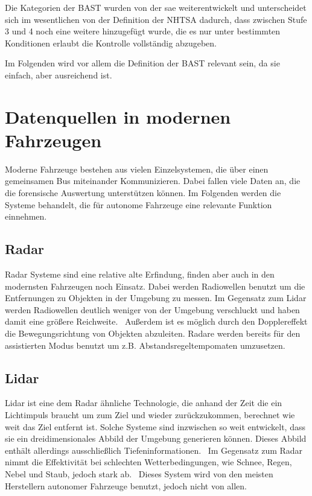 \documentclass[conference,compsoc,final,a4paper]{IEEEtran}
\begin{document}
Die Kategorien der \ac{BAST} wurden von der \ac{sae} weiterentwickelt \cite{bast2021} und unterscheidet sich im wesentlichen von der Definition der \ac{NHTSA} dadurch, dass zwischen Stufe 3 und 4 noch eine weitere hinzugefügt wurde, die es nur unter bestimmten Konditionen erlaubt die Kontrolle vollständig abzugeben\cite{SAE2021}.

Im Folgenden wird vor allem die Definition der \ac{BAST} relevant sein, da sie einfach, aber ausreichend ist.

\section{Datenquellen in modernen Fahrzeugen}

Moderne Fahrzeuge bestehen aus vielen Einzelsystemen, die über einen gemeinsamen Bus miteinander Kommunizieren.
Dabei fallen viele Daten an, die die forensische Auswertung unterstützen können. Im Folgenden werden die Systeme behandelt,
die für autonome Fahrzeuge eine relevante Funktion einnehmen.


\subsection{Radar}

Radar Systeme sind eine relative alte Erfindung, finden aber auch in den modernsten Fahrzeugen noch Einsatz.
Dabei werden Radiowellen benutzt um die Entfernungen zu Objekten in der Umgebung zu messen.
Im Gegensatz zum Lidar werden Radiowellen deutlich weniger von der Umgebung verschluckt und haben damit eine
größere Reichweite.~\cite{Neal2018} Außerdem ist es möglich durch den Dopplereffekt die Bewegungsrichtung von Objekten abzuleiten.
Radare werden bereits für den assistierten Modus benutzt um z.B. Abstandsregeltempomaten umzusetzen.

\subsection{Lidar}

Lidar ist eine dem Radar ähnliche Technologie, die anhand der Zeit die ein Lichtimpuls braucht um zum Ziel und wieder zurückzukommen, berechnet wie weit das Ziel entfernt ist. Solche Systeme sind inzwischen so weit entwickelt, dass sie ein
dreidimensionales Abbild der Umgebung generieren können.
Dieses Abbild enthält allerdings ausschließlich Tiefeninformationen.~\cite{Liu2018}
Im Gegensatz zum Radar nimmt die Effektivität bei schlechten Wetterbedingungen, wie Schnee, Regen, Nebel und Staub, jedoch stark ab.~\cite{Neal2018}
Dieses System wird von den meisten Herstellern autonomer Fahrzeuge benutzt, jedoch nicht von allen.~\cite{Dickson2021}
\end{document}
